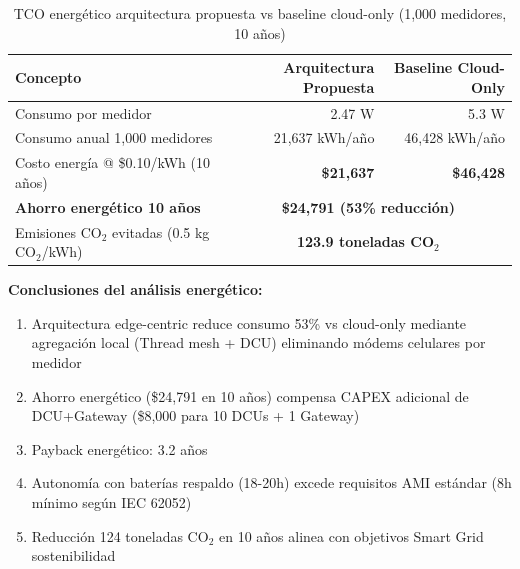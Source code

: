 \begin{table}[H]
\centering
\caption{TCO energético arquitectura propuesta vs baseline cloud-only (1,000 medidores, 10 años)}
\label{tab:energy-tco}
\begin{tabular}{|l|r|r|}
\hline
\rowcolor{gray!20}
\textbf{Concepto} & \textbf{Arquitectura Propuesta} & \textbf{Baseline Cloud-Only} \\
\hline
Consumo por medidor & 2.47 W & 5.3 W \\
\hline
Consumo anual 1,000 medidores & 21,637 kWh/año & 46,428 kWh/año \\
\hline
Costo energía @ \$0.10/kWh (10 años) & \textbf{\$21,637} & \textbf{\$46,428} \\
\hline
\rowcolor{blue!10}
\textbf{Ahorro energético 10 años} & \multicolumn{2}{c|}{\textbf{\$24,791 (53\% reducción)}} \\
\hline
Emisiones CO$_{2}$ evitadas (0.5 kg CO$_{2}$/kWh) & \multicolumn{2}{c|}{\textbf{123.9 toneladas CO$_{2}$}} \\
\hline
\end{tabular}
\end{table}

\textbf{Conclusiones del análisis energético:}

\begin{enumerate}
    \item Arquitectura edge-centric reduce consumo 53\% vs cloud-only mediante agregación local (Thread mesh + DCU) eliminando módems celulares por medidor
    \item Ahorro energético (\$24,791 en 10 años) compensa CAPEX adicional de DCU+Gateway (\$8,000 para 10 DCUs + 1 Gateway)
    \item Payback energético: 3.2 años
    \item Autonomía con baterías respaldo (18-20h) excede requisitos AMI estándar (8h mínimo según IEC 62052)
    \item Reducción 124 toneladas CO$_{2}$ en 10 años alinea con objetivos Smart Grid sostenibilidad
\end{enumerate}

